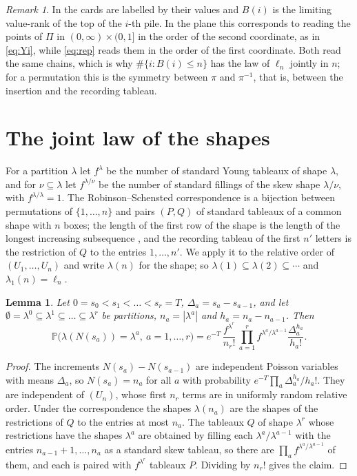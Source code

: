 \documentclass[11pt]{amsart}
\newtheorem{lemma}[theorem]{Lemma}
\theoremstyle{remark}
\newtheorem{remark}[theorem]{Remark}
\numberwithin{equation}{section}
\newcommand{\Pp}{\mathbb P}
\begin{document}
\begin{remark}\label{rem:AD93}
In \cite{AD93} the cards are labelled by their values and $B(i)$ is the limiting value-rank of the top of the $i$-th pile. In the plane this corresponds to reading the points of $\Pi$ in $(0,\infty)\times(0,1]$ in the order of the second coordinate, as in \eqref{eq:Yi}, while \eqref{eq:rep} reads them in the order of the first coordinate. Both read the same chains, which is why $\#\{i:B(i)\le n\}$ has the law of $\ell_n$ jointly in $n$; for a permutation this is the symmetry between $\pi$ and $\pi^{-1}$, that is, between the insertion and the recording tableau.
\end{remark}

\section{The joint law of the shapes}\label{sec:shapes}

For a partition $\lambda$ let $f^\lambda$ be the number of standard Young tableaux of shape $\lambda$, and for $\nu\subseteq\lambda$ let $f^{\lambda/\nu}$ be the number of standard fillings of the skew shape $\lambda/\nu$, with $f^{\lambda/\lambda}=1$. The Robinson--Schensted correspondence is a bijection between permutations of $\{1,\dots,n\}$ and pairs $(P,Q)$ of standard tableaux of a common shape with $n$ boxes; the length of the first row of the shape is the length of the longest increasing subsequence \cite{Sch61}, and the recording tableau of the first $n'$ letters is the restriction of $Q$ to the entries $1,\dots,n'$. We apply it to the relative order of $(U_1,\dots,U_n)$ and write $\lambda(n)$ for the shape; so $\lambda(1)\subseteq\lambda(2)\subseteq\cdots$ and $\lambda_1(n)=\ell_n$.

\begin{lemma}\label{lem:weight}
Let $0=s_0<s_1<\dots<s_r=T$, $\Delta_a=s_a-s_{a-1}$, and let $\emptyset=\lambda^0\subseteq\lambda^1\subseteq\dots\subseteq\lambda^r$ be partitions, $n_a=|\lambda^a|$ and $h_a=n_a-n_{a-1}$. Then
\[
\Pp\bigl(\lambda(N(s_a))=\lambda^a,\ a=1,\dots,r\bigr)=e^{-T}\,\frac{f^{\lambda^r}}{n_r!}\,\prod_{a=1}^r f^{\lambda^a/\lambda^{a-1}}\frac{\Delta_a^{h_a}}{h_a!}.
\]
\end{lemma}

\begin{proof}
The increments $N(s_a)-N(s_{a-1})$ are independent Poisson variables with means $\Delta_a$, so $N(s_a)=n_a$ for all $a$ with probability $e^{-T}\prod_a\Delta_a^{h_a}/h_a!$. They are independent of $(U_n)$, whose first $n_r$ terms are in uniformly random relative order. Under the correspondence the shapes $\lambda(n_a)$ are the shapes of the restrictions of $Q$ to the entries at most $n_a$. The tableaux $Q$ of shape $\lambda^r$ whose restrictions have the shapes $\lambda^a$ are obtained by filling each $\lambda^a/\lambda^{a-1}$ with the entries $n_{a-1}+1,\dots,n_a$ as a standard skew tableau, so there are $\prod_af^{\lambda^a/\lambda^{a-1}}$ of them, and each is paired with $f^{\lambda^r}$ tableaux $P$. Dividing by $n_r!$ gives the claim.
\end{proof}
\end{document}
